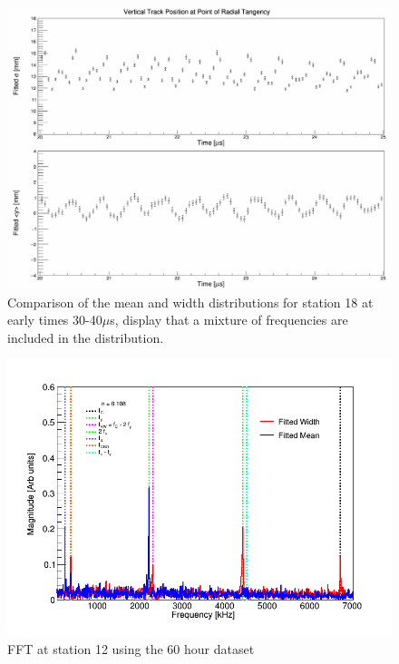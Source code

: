 \begin{figure}[!h]
\centering 
\includegraphics[scale=0.2]{Figures/Width_mean_comparison_station18.png}
\decoRule
\caption{Comparison of the mean and width distributions for station 18 at early times 30-40$\mu$s, display that a mixture of frequencies are included in the distribution.}
\label{fig:Width_mean_comparison_station18}
\end{figure}

\begin{figure}[!h]
\centering 
\includegraphics[scale=0.5]{Figures/FFT_fittedWidth_fittedMean_station12.png}
\decoRule
\caption{FFT at station 12 using the 60 hour dataset}
\label{fig:FFT_fittedWidth_fittedMean_station12.png}
\end{figure}

